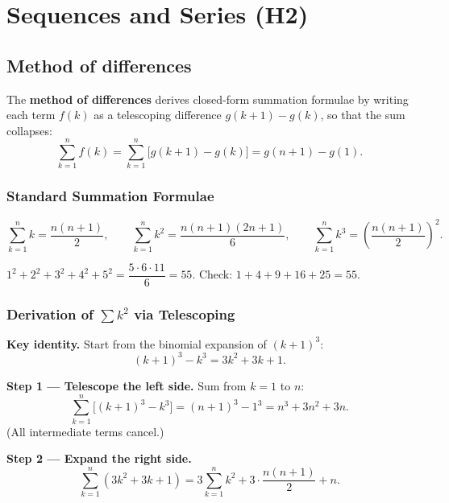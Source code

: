 
\section{Sequences and Series (H2)}

\subsection{Method of differences}

\begin{definition}
The \textbf{method of differences} derives closed-form summation formulae by writing each term $f(k)$ as a telescoping difference $g(k+1) - g(k)$, so that the sum collapses:
\[
\sum_{k=1}^n f(k) = \sum_{k=1}^n \bigl[g(k+1) - g(k)\bigr] = g(n+1) - g(1).
\]
\end{definition}

\subsubsection*{Standard Summation Formulae}

\begin{theorem}
\[
\sum_{k=1}^n k = \frac{n(n+1)}{2}, \qquad
\sum_{k=1}^n k^2 = \frac{n(n+1)(2n+1)}{6}, \qquad
\sum_{k=1}^n k^3 = \left(\frac{n(n+1)}{2}\right)^2.
\]
\end{theorem}

\begin{example}
$1^2 + 2^2 + 3^2 + 4^2 + 5^2 = \dfrac{5 \cdot 6 \cdot 11}{6} = 55$. Check: $1+4+9+16+25=55$. \checkmark
\end{example}

\subsubsection*{Derivation of $\sum k^2$ via Telescoping}

\textbf{Key identity.} Start from the binomial expansion of $(k+1)^3$:
\[
(k+1)^3 - k^3 = 3k^2 + 3k + 1.
\]

\textbf{Step 1 — Telescope the left side.} Sum from $k = 1$ to $n$:
\[
\sum_{k=1}^n \bigl[(k+1)^3 - k^3\bigr] = (n+1)^3 - 1^3 = n^3 + 3n^2 + 3n.
\]
(All intermediate terms cancel.)

\textbf{Step 2 — Expand the right side.}
\[
\sum_{k=1}^n (3k^2 + 3k + 1) = 3\sum_{k=1}^n k^2 + 3\cdot\frac{n(n+1)}{2} + n.
\]

